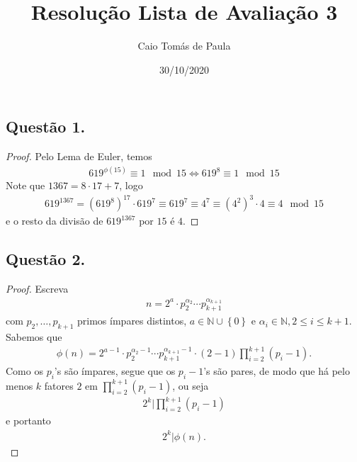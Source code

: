 \documentclass[a4paper,12pt]{article}
\title{Resolução Lista de Avaliação 3}
\date{30/10/2020}
\author{Caio Tomás de Paula}
\theoremstyle{definition}
\begin{document}
	\maketitle
	\subsection*{Questão 1.}
	\begin{proof}
		Pelo Lema de Euler, temos
		\begin{align*}
		619^{\phi(15)}\equiv 1\mod 15 \Leftrightarrow 619^{8}\equiv 1\mod 15
		\end{align*}
		Note que $1367 = 8\cdot 17 + 7$, logo
		\begin{align*}
		619^{1367} = (619^{8})^{17}\cdot 619^7 \equiv 619^7 \equiv 4^7 \equiv (4^2)^3\cdot 4 \equiv 4 \mod 15
		\end{align*}
		e o resto da divisão de $619^{1367}$ por $15$ é $4$.
	\end{proof}
	\subsection*{Questão 2.}
	\begin{proof}
		Escreva
		\begin{align*}
		n = 2^{a}\cdot p_2^{\alpha_2}\cdots p_{k+1}^{\alpha_{k+1}}
		\end{align*}
		com $p_2, \dots, p_{k+1}$ primos ímpares distintos, $a\in\mathbb{N}\cup\left\{0\right\}$ e $\alpha_i\in\mathbb{N}, 2\leq i\leq k+1$. Sabemos que
		\begin{align*}
		\phi(n) = 2^{a-1}\cdot p_2^{\alpha_2-1}\cdots p_{k+1}^{\alpha_{k+1}-1}\cdot (2-1)\prod_{i=2}^{k+1}(p_i - 1).
		\end{align*}
		Como os $p_i$'s são ímpares, segue que os $p_i-1$'s são pares, de modo que há pelo menos $k$ fatores $2$ em $\displaystyle{\prod_{i=2}^{k+1} (p_i - 1)}$, ou seja
		\begin{align*}
		2^k\Big|\prod_{i=2}^{k+1}(p_i-1)
		\end{align*}
		e portanto
		\begin{align*}
		2^k|\phi(n).
		\end{align*}
	\end{proof}
\end{document}
